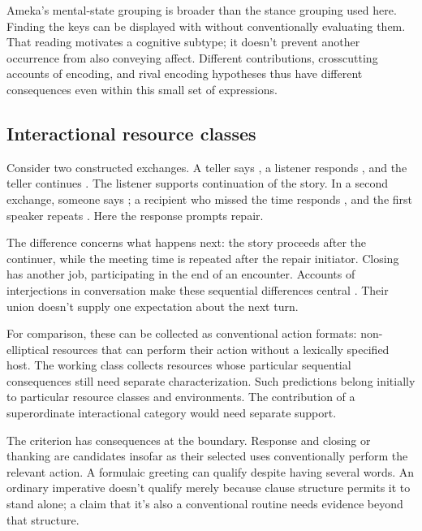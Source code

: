 \documentclass[12pt]{article}
\begin{document}
Ameka's mental-state grouping is broader than the stance grouping used
here. Finding the keys can be displayed with  without
conventionally evaluating them. That reading motivates a cognitive subtype;
it doesn't prevent another occurrence from also conveying affect.
Different contributions, crosscutting accounts of encoding, and rival
encoding hypotheses thus have different consequences even within this
small set of expressions.

\subsection{Interactional resource classes}

Consider two constructed exchanges. A teller says , a listener responds , and the teller continues
. The listener supports continuation of the
story. In a second exchange, someone says ;
a recipient who missed the time responds , and the first
speaker repeats . Here the response prompts repair.

The difference concerns what happens next: the story proceeds after
the continuer, while the meeting time is repeated after the repair
initiator. Closing  has another job, participating in the
end of an encounter. Accounts of interjections in conversation make
these sequential differences central \citep[257--259, 263--265]{dingemanse2024}.
Their union doesn't supply one expectation about the next turn.

For comparison, these can be collected as conventional action formats:
non-elliptical resources that can perform their action without a lexically
specified host. The working class collects resources whose particular sequential
consequences still need separate characterization. Such predictions belong initially to
particular resource classes and environments. The contribution of a
superordinate interactional category would need separate support.

The criterion has consequences at the boundary. Response 
and closing or thanking  are candidates insofar as their
selected uses conventionally perform the relevant action. A formulaic
greeting  can qualify despite having several words.
An ordinary imperative  doesn't qualify merely because
clause structure permits it to stand alone; a claim that it's also a
conventional routine needs evidence beyond that structure.
\end{document}
